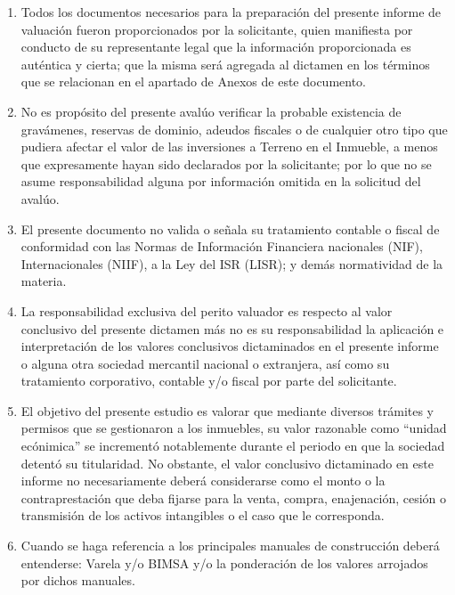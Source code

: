 \begin{enumerate}[\indent a)]

\item Todos los documentos necesarios para la preparaci\'on del presente informe de valuaci\'on fueron proporcionados por la solicitante, quien manifiesta por conducto de su representante legal que la informaci\'on proporcionada es aut\'entica y cierta; que la misma ser\'a agregada al dictamen en los t\'erminos que se relacionan en el apartado de Anexos de este documento.

\item No es prop\'osito del presente aval\'uo verificar la probable existencia de grav\'amenes, reservas de dominio, adeudos fiscales o de cualquier otro tipo que pudiera afectar el valor de las inversiones a Terreno en el Inmueble, a menos que expresamente hayan sido declarados por la solicitante; por lo que no se asume responsabilidad alguna por informaci\'on omitida en la solicitud del aval\'uo.

\item El presente documento no valida o se\~nala su tratamiento contable o fiscal de conformidad con las Normas de Informaci\'on Financiera nacionales (NIF), Internacionales (NIIF), a la Ley del ISR (LISR); y dem\'as normatividad de la materia.

\item La responsabilidad exclusiva del perito valuador es respecto al valor conclusivo del presente dictamen m\'as no es su responsabilidad la aplicaci\'on e interpretaci\'on de los valores conclusivos dictaminados en el presente informe o alguna otra sociedad mercantil nacional o extranjera, as\'i como su tratamiento corporativo, contable y/o fiscal por parte del solicitante.

\item El objetivo del presente estudio es valorar que mediante diversos tr\'amites y permisos que se gestionaron a los inmuebles, su valor razonable como ``unidad ec\'onimica'' se increment\'o notablemente durante el periodo en que la sociedad \empresaCorto{} detent\'o su titularidad. No obstante, el valor conclusivo dictaminado en este informe no necesariamente deber\'a considerarse como el monto o la contraprestaci\'on que deba fijarse para la venta, compra, enajenaci\'on, cesi\'on o transmisi\'on de los activos intangibles o el caso que le corresponda.

\item Cuando se haga referencia a los principales manuales de construcci\'on deber\'a entenderse: Varela y/o BIMSA y/o la ponderaci\'on de los valores arrojados por dichos manuales.


\end{enumerate}
